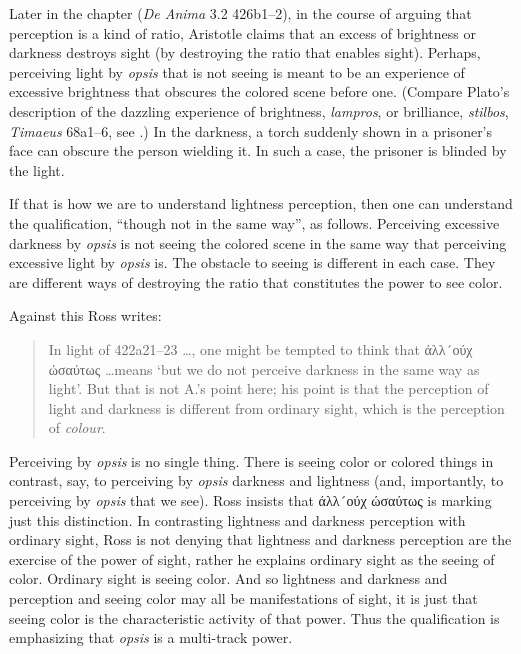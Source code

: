 
Later in the chapter (\emph{De Anima} 3.2 426b1–2), in the course of arguing that perception is a kind of ratio, Aristotle claims that an excess of brightness or darkness destroys sight (by destroying the ratio that enables sight). Perhaps, perceiving light by \emph{opsis} that is not seeing is meant to be an experience of excessive brightness that obscures the colored scene before one. (Compare Plato's description of the dazzling experience of brightness, \emph{lampros}, or brilliance, \emph{stilbos}, \emph{Timaeus} 68a1–6, see \citealt[72–7]{Kalderon:2022kl}.) In the darkness, a torch suddenly shown in a prisoner's face can obscure the person wielding it. In such a case, the prisoner is blinded by the light.

If that is how we are to understand lightness perception, then one can understand the qualification, ``though not in the same way'', as follows. Perceiving excessive darkness by \emph{opsis} is not seeing the colored scene in the same way that perceiving excessive light by \emph{opsis} is. The obstacle to seeing is different in each case. They are different ways of destroying the ratio that constitutes the power to see color. 

Against this Ross writes:
\begin{quote}
	In light of 422a21–23 \ldots, one might be tempted to think that {\sbl άλλ´ούχ ώσαύτως} \ldots means `but we do not perceive darkness in the same way as light'. But that is not A.'s point here; his point is that the perception of light and darkness is different from ordinary sight, which is the perception of \emph{colour}. \citep[275]{Ross:1961uq}
\end{quote}
Perceiving by \emph{opsis} is no single thing. There is seeing color or colored things in contrast, say, to perceiving by \emph{opsis} darkness and lightness (and, importantly, to perceiving by \emph{opsis} that we see). Ross insists that {\sbl άλλ´ούχ ώσαύτως} is marking just this distinction. In contrasting lightness and darkness perception with ordinary sight, Ross is not denying that lightness and darkness perception are the exercise of the power of sight, rather he explains ordinary sight as the seeing of color. Ordinary sight is seeing color. And so lightness and darkness and perception and seeing color may all be manifestations of sight, it is just that seeing color is the characteristic activity of that power. Thus the qualification is emphasizing that \emph{opsis} is a multi-track power.


